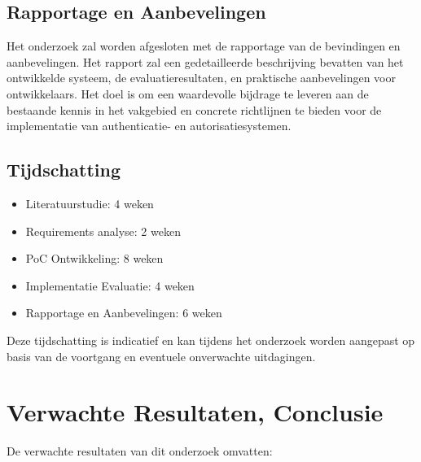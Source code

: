 \subsection{Rapportage en Aanbevelingen}

Het onderzoek zal worden afgesloten met de rapportage van de bevindingen en aanbevelingen. Het rapport zal een gedetailleerde beschrijving bevatten 
van het ontwikkelde systeem, de evaluatieresultaten, en praktische aanbevelingen voor ontwikkelaars. Het doel is om een waardevolle bijdrage te leveren 
aan de bestaande kennis in het vakgebied en concrete richtlijnen te bieden voor de implementatie van authenticatie- en autorisatiesystemen.

\subsection{Tijdschatting}

\begin{itemize}
\item Literatuurstudie: 4 weken
\item Requirements analyse: 2 weken
\item PoC Ontwikkeling: 8 weken
\item Implementatie Evaluatie: 4 weken
\item Rapportage en Aanbevelingen: 6 weken
\end{itemize}

Deze tijdschatting is indicatief en kan tijdens het onderzoek worden aangepast op basis van de voortgang en eventuele onverwachte uitdagingen.

\section{Verwachte Resultaten, Conclusie}%
\label{sec:verwachte_resultaten}

De verwachte resultaten van dit onderzoek omvatten:

